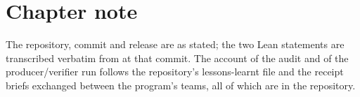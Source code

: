 \section*{Chapter note}

The repository, commit and release are as stated; the two Lean statements are
transcribed verbatim from  at that
commit. The account of the audit and of the producer/verifier run follows the
repository's lessons-learnt file and the receipt briefs exchanged between the
program's teams, all of which are in the repository.
